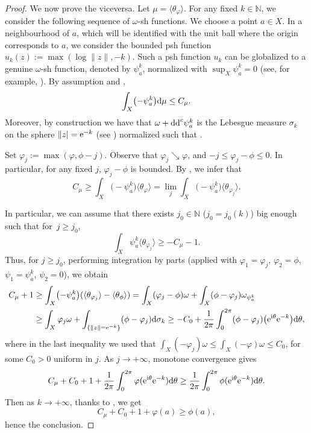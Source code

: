 \documentclass[pdftex]{sigma}
\numberwithin{equation}{section}
\theoremstyle{plain}
\begin{document}
\begin{proof}
We now prove the viceversa. Let $\mu=\langle \theta_\varphi \rangle $. For any fixed $k\in \mathbb{N}$, we consider the following sequence of $\omega$-sh functions.
We choose a point $a \in X$. In a neighbourhood of $a$, which will be identified with the unit ball where the origin corresponds to $a$, we consider the bounded psh function $u_k(z):=\max(\log\|z\|, -k)$.
Such a psh function $u_k$ can be globalized to a genuine $\omega$-sh function, denoted by $\psi_a^k$, normalized with $\sup_X \psi_a^k=0$ (see, for example, \cite[p.~613]{GZ05}).
By assumption and \cite[Proposition~2.7]{GZ05},
\[\int_X \bigl(-\psi_a^k\bigr) {\rm d}\mu \leq C_{\mu}.\]
 Moreover, by construction we have that $\omega+{\rm dd}^c \psi_a^k$ is the Lebesgue measure $\sigma_k$ on the sphere $\|z|={\rm e}^{-k}$ (see \cite[Example~3.13]{GZbook}) normalized such that .

Set $\varphi_j:=\max(\varphi, \phi-j)$. Observe that $\varphi_j \searrow \varphi$, and $ -j \leq \varphi_j-\phi\leq 0$. In particular, for any fixed $j$, $ \varphi_j-\phi$ is bounded.
By \cite[Remark~2.5]{DDL2}, we infer that
\[C_\mu \geq \int_X \bigl(-\psi_a^k\bigr) \langle\theta_\varphi \rangle= \lim_j \int_X \bigl(-\psi_a^k\bigr) \langle \theta_{\varphi_j}\rangle.\]

In particular, we can assume that there exists $j_0 \in \mathbb{N}$ ($j_0=j_0(k)$) big enough such that for~${j\geq j_0}$,
\[\int_X \psi_a^k \langle \theta_{\varphi_j}\rangle \geq -C_\mu -1.\]
Thus, for $j\geq j_0$, performing integration by parts \cite[Lemma~4.7]{DDL6} (applied with $\varphi_1=\varphi_j$, $\varphi_2=\phi$, $\psi_1= \psi_a^k$, $\psi_2=0$), we obtain
\begin{align*}
C_\mu +1 &\geq \int_X \bigl(-\psi_a^k\bigr) (\langle \theta_{\varphi_j}\rangle-\langle \theta_\phi \rangle)=\int_X (\varphi_j-\phi)\omega+\int_X (\phi-\varphi_j ) \omega_{\psi_a^k}\\
&\geq \int_X \varphi_j \omega+ \int_{\{\lVert z\rVert ={\rm e}^{-k}\}} (\phi-\varphi_j ) {\rm d}\sigma_k\geq -C_0+ \frac{1}{2\pi}\int_{0}^{2\pi} (\phi-\varphi_j )\big({\rm e}^{{\rm i}\theta} {\rm e}^{-k}\big) {\rm d}\theta,
\end{align*}
where in the last inequality we used that $\int_X (-\varphi_j) \omega \leq \int_X (-\varphi) \omega \leq C_0$, for some $C_0>0$ uniform in $j$.
As $j\rightarrow +\infty$, monotone convergence gives
\[ C_\mu +C_0 +1 + \frac{1}{2\pi }\int_{0}^{2\pi} \varphi ({\rm e}^{{\rm i}\theta} {\rm e}^{-k}) {\rm d}\theta \geq \frac{1}{2\pi }\int_{0}^{2\pi} \phi({\rm e}^{{\rm i}\theta} {\rm e}^{-k}) {\rm d}\theta.\]
Then as $k\to +\infty$, thanks to \cite[Proposition 1.13]{GZbook}, we get
\[ C_\mu +C_0 +1 +\varphi(a) \geq \phi (a),\]
hence the conclusion.
\end{proof}
\end{document}
